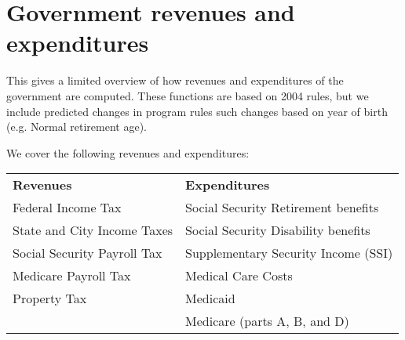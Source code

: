 \section{Government revenues and expenditures}
This gives a limited overview of how revenues and expenditures of the government are computed. These 
functions are based on 2004 rules, but we include predicted changes in program rules such changes 
based on year of birth (e.g. Normal retirement age).

We cover the following revenues and expenditures:\\

\begin{center}
\begin{tabular}{l l}
\textbf{Revenues} & \textbf{Expenditures}\\
Federal Income Tax & Social Security Retirement benefits\\
State and City Income Taxes & Social Security Disability benefits\\
Social Security Payroll Tax & Supplementary Security Income (SSI)\\
Medicare Payroll Tax & Medical Care Costs\\
Property Tax & Medicaid\\
 & Medicare (parts A, B, and D)
\end{tabular}
\end{center}







